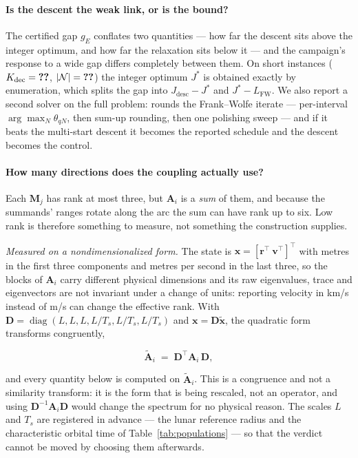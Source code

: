 \paragraph{Is the descent the weak link, or is the bound?} The certified gap
$g_E$ conflates two quantities --- how far the descent sits above the integer
optimum, and how far the relaxation sits below it --- and the campaign's
response to a wide gap differs completely between them. On short instances
($K_{\mathrm{dec}}=\ph{n}$, $\lvert\mathcal N\rvert=\ph{n}$) the integer
optimum $J^{*}$ is obtained exactly by enumeration, which splits the gap into
$J_{\mathrm{desc}}-J^{*}$ and $J^{*}-L_{\mathrm{FW}}$.  We also report a second solver on the full problem:
 rounds the Frank--Wolfe iterate --- per-interval
$\arg\max_N\theta_{qN}$,
then sum-up rounding, then one polishing sweep --- and if it beats the
multi-start descent it becomes the reported schedule and the descent becomes
the control.

\paragraph{How many directions does the coupling actually use?} Each
$\mathbf M_j$ has rank at most three, but $\mathbf A_i$ is a \emph{sum} of
them, and because the summands' ranges rotate along the arc the sum can have
rank up to six. Low rank is therefore something to measure, not something the
construction supplies.

\emph{Measured on a nondimensionalized form.} The state is
$\mathbf x=[\mathbf r^{\top}\ \mathbf v^{\top}]^{\top}$ with metres in the
first three components and metres per second in the last three, so the blocks
of $\mathbf A_i$ carry different physical dimensions and its raw eigenvalues,
trace and eigenvectors are not invariant under a change of units: reporting
velocity in km/s instead of m/s can change the effective rank. With
$\mathbf D=\operatorname{diag}(L,L,L,L/T_s,L/T_s,L/T_s)$ and
$\mathbf x=\mathbf D\tilde{\mathbf x}$, the quadratic form transforms
congruently,

\begin{equation}
  \tilde{\mathbf A}_i \;=\; \mathbf D^{\top}\mathbf A_i\,\mathbf D ,
  \label{eq:nondim-form}
\end{equation}

and every quantity below is computed on $\tilde{\mathbf A}_i$. This is a
congruence and not a similarity transform: it is the form that is being
rescaled, not an operator, and using $\mathbf D^{-1}\mathbf A_i\mathbf D$
would change the spectrum for no physical reason. The scales $L$ and $T_s$ are
registered in advance --- the lunar reference radius and the characteristic
orbital time of Table~\ref{tab:populations} --- so that the verdict cannot be
moved by choosing them afterwards.

